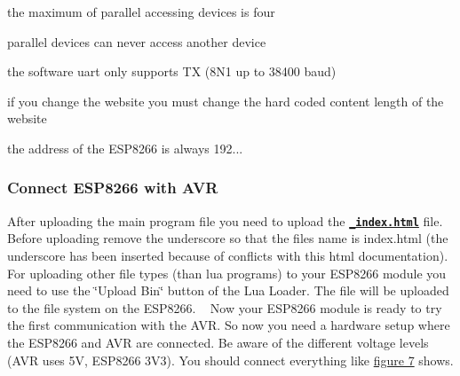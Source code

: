 \begin{DoxyItemize}
\item the maximum of parallel accessing devices is four 
\item parallel devices can never access another device 
\item the software uart only supports T\+X (8\+N1 up to 38400 baud) 
\item if you change the website you must change the hard coded content length of the website 
\item the address of the E\+S\+P8266 is always 192... 
\end{DoxyItemize}\hypertarget{index_avr_con_esp}{}\subsubsection{Connect E\+S\+P8266 with A\+V\+R}\label{index_avr_con_esp}
After uploading the main program file you need to upload the \href{_index.html}{\tt {\bfseries \+\_\+index.\+html}} file. Before uploading remove the underscore so that the files name is index.\+html (the underscore has been inserted because of conflicts with this html documentation). For uploading other file types (than lua programs) to your E\+S\+P8266 module you need to use the \char`\"{}\+Upload Bin\char`\"{} button of the Lua Loader. The file will be uploaded to the file system on the E\+S\+P8266. ~\newline
 Now your E\+S\+P8266 module is ready to try the first communication with the A\+V\+R. So now you need a hardware setup where the E\+S\+P8266 and A\+V\+R are connected. Be aware of the different voltage levels (A\+V\+R uses 5\+V, E\+S\+P8266 3\+V3). You should connect everything like \hyperlink{index_seven}{figure 7} shows.

\label{index_seven}%
\hypertarget{index_seven}{}%

